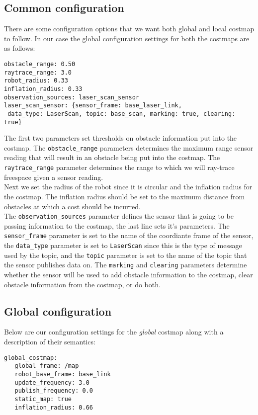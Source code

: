 \subsection{Common configuration}
There are some configuration options that we want both global and local costmap 
to follow. In our case the global configuration settings for both the costmaps are 
as follows:
\begin{lstlisting}
obstacle_range: 0.50
raytrace_range: 3.0
robot_radius: 0.33
inflation_radius: 0.33
observation_sources: laser_scan_sensor
laser_scan_sensor: {sensor_frame: base_laser_link,
 data_type: LaserScan, topic: base_scan, marking: true, clearing: true}
\end{lstlisting}
The first two parameters set thresholds on obstacle information put into the 
costmap. The \texttt{obstacle\_range} parameters determines the maximum range sensor
reading that will result in an obstacle being put into the costmap.
The \texttt{raytrace\_range} parameter determines the range to which we will ray-trace 
freespace given a sensor reading.
\\
Next we set the radius of the robot since it is circular and the inflation radius 
for the costmap. The inflation radius should be set to the maximum distance 
from obstacles at which a cost should be incurred. 
\\
The \texttt{observation\_sources} parameter defines the sensor that is going to be passing 
information to the costmap, the last line sets it's parameters. The \texttt{sensor\_frame}
parameter is set to the name of the coordiante frame of the sensor, the \texttt{data\_type}
parameter is set to \texttt{LaserScan} since this is the type of message used by the topic,
and the \texttt{topic} parameter is set to the name of the topic that the sensor 
publishes data on. The \texttt{marking} and \texttt{clearing} parameters determine 
whether the sensor will be used to add obstacle information to the costmap, clear obstacle
information from the costmap, or do both.

\subsection{Global configuration}
Below are our configuration settings for the \textit{global} costmap along with a
description of their semantics:
\begin{lstlisting}
global_costmap:
   global_frame: /map
   robot_base_frame: base_link
   update_frequency: 3.0
   publish_frequency: 0.0
   static_map: true
   inflation_radius: 0.66
\end{lstlisting}

